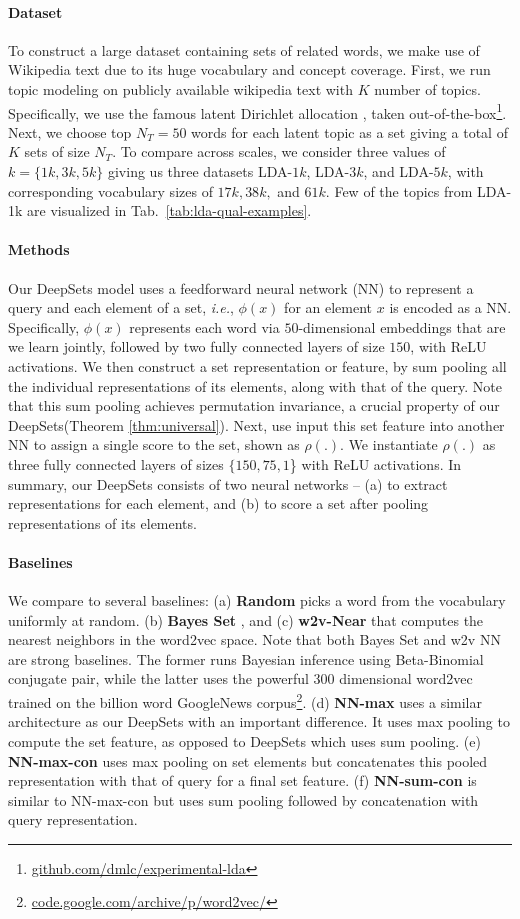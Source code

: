 \documentclass{article}
\newcommand{\compactparagraph}[1]{\vspace*{-10pt}\paragraph{#1}}
\newcommand{\reftab}[1]{Tab.~\ref{#1}}
\newcommand{\refthm}[1]{Theorem \ref{#1}}
\newcommand{\latinphrase}[1]{\emph{#1}}    %
\newcommand{\ie}{\latinphrase{i.e.}\xspace}
\newcommand{\deepsets}{DeepSets\xspace}
\begin{document}
\compactparagraph{Dataset}
To construct a large dataset containing sets of related words, we make use of Wikipedia text due to its huge vocabulary and concept coverage. First, we run topic modeling on publicly available wikipedia text with $K$ number of topics. Specifically, we use the famous latent Dirichlet allocation \cite{Pritchard945, Blei03latentdirichlet}, taken out-of-the-box\footnote{\url{github.com/dmlc/experimental-lda}}. Next, we choose top $N_T=50$ words for each latent topic as a set giving a total of $K$ sets of size $N_T$. To compare across scales, we consider three values of $k=\{1k, 3k, 5k\}$ giving us three datasets LDA-$1k$, LDA-$3k$, and LDA-$5k$, with corresponding vocabulary sizes of $17k, 38k,$ and $61k$. Few of the topics from LDA-1k are visualized in \reftab{tab:lda-qual-examples}.

\compactparagraph{Methods}
Our \deepsets model uses a feedforward neural network (NN) to represent a query and each element of a set, \ie, $\phi(x)$  for an element $x$ is encoded as a NN.
Specifically, $\phi(x)$ represents each word via $50$-dimensional embeddings that are we learn jointly, followed by two fully connected layers of size $150$, with ReLU activations.
We then construct a set representation or feature, by sum pooling all the individual representations of its elements, along with that of the query.
Note that this sum pooling achieves permutation invariance, a crucial property of our \deepsets (\refthm{thm:universal}). Next, use input this set feature into another NN to assign a single score to the set, shown as $\rho(.)$.
We instantiate $\rho(.)$ as three fully connected layers of sizes $\{150, 75, 1$\} with ReLU activations.
In summary, our \deepsets consists of two neural networks -- (a) to extract representations for each element, and (b) to score a set after pooling representations of its elements.

\compactparagraph{Baselines}
We compare to several baselines: (a) \textbf{Random} picks a word from the vocabulary uniformly at random. (b) \textbf{Bayes Set} \cite{ghahramani2005bayesian}, and (c) \textbf{w2v-Near} that computes the nearest neighbors in the word2vec \cite{mikolov2013distributed} space. Note that both Bayes Set and w2v NN are strong baselines.
The former runs Bayesian inference using Beta-Binomial conjugate pair, while the latter uses the powerful $300$ dimensional word2vec trained on the billion word GoogleNews corpus\footnote{\url{code.google.com/archive/p/word2vec/}}. (d) \textbf{NN-max} uses a similar architecture as our \deepsets with an important difference. It uses max pooling to compute the set feature, as opposed to \deepsets which uses sum pooling. (e) \textbf{NN-max-con} uses max pooling on set elements but concatenates this pooled representation with that of query for a final set feature. (f) \textbf{NN-sum-con} is similar to NN-max-con but uses sum pooling followed by concatenation with query representation. 
\end{document}
